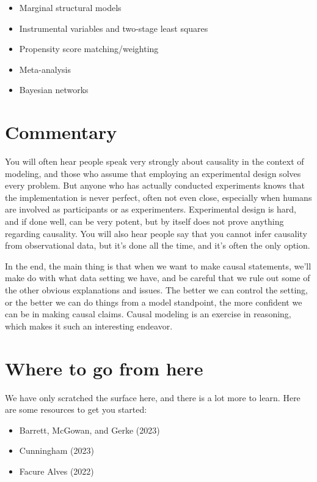 \documentclass[
  letterpaper,
]{krantz}
\providecommand{\tightlist}{%
  \setlength{\itemsep}{0pt}\setlength{\parskip}{0pt}}\usepackage{longtable,booktabs,array}
\begin{document}
\begin{itemize}
\tightlist
\item
  Marginal structural models
\item
  Instrumental variables and two-stage least squares
\item
  Propensity score matching/weighting
\item
  Meta-analysis
\item
  Bayesian networks
\end{itemize}

\section{Commentary}\label{commentary-2}

You will often hear people speak very strongly about causality in the
context of modeling, and those who assume that employing an experimental
design solves every problem. But anyone who has actually conducted
experiments knows that the implementation is never perfect, often not
even close, especially when humans are involved as participants or as
experimenters. Experimental design is hard, and if done well, can be
very potent, but by itself does not prove anything regarding causality.
You will also hear people say that you cannot infer causality from
observational data, but it's done all the time, and it's often the only
option.

In the end, the main thing is that when we want to make causal
statements, we'll make do with what data setting we have, and be careful
that we rule out some of the other obvious explanations and issues. The
better we can control the setting, or the better we can do things from a
model standpoint, the more confident we can be in making causal claims.
Causal modeling is an exercise in reasoning, which makes it such an
interesting endeavor.

\section{Where to go from here}\label{where-to-go-from-here-4}

We have only scratched the surface here, and there is a lot more to
learn. Here are some resources to get you started:

\begin{itemize}
\tightlist
\item
  Barrett, McGowan, and Gerke (2023)
\item
  Cunningham (2023)
\item
  Facure Alves (2022)
\end{itemize}
\end{document}
